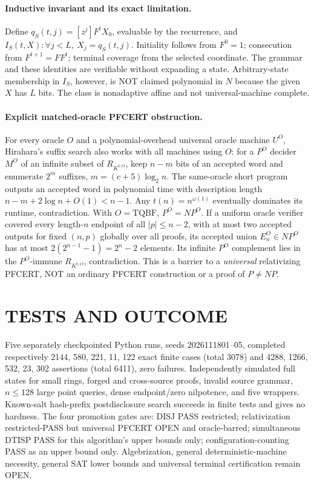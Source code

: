 \documentclass[10pt]{article}
\begin{document}
\paragraph{Inductive invariant and its exact limitation.}
Define $q_S(t,j)=[z^j]F^tX_0$, evaluable by the recurrence,
and $I_S(t,X):\forall j<L,\ X_j=q_S(t,j)$.
Initiality follows from $F^0=1$; consecution from
$F^{t+1}=FF^t$; terminal coverage from the selected coordinate.
The grammar and these identities are verifiable without expanding
a state. Arbitrary-state membership in $I_S$, however, is
NOT claimed polynomial in $N$ because the given $X$ has $L$ bits.
The class is nonadaptive affine and not universal-machine complete.

\paragraph{Explicit matched-oracle PFCERT obstruction.}
For every oracle $O$ and a polynomial-overhead universal oracle
machine $U^O$, Hirahara's suffix search also works with all
machines using $O$: for a $P^O$ decider $M^O$ of an infinite subset
of $R_{K^{t,O}}$, keep $n-m$ bits of an accepted word and enumerate
$2^{m}$ suffixes, $m=(c+5)\log_2 n$. The same-oracle short program
outputs an accepted word in polynomial time with description
length $n-m+2\log n+O(1)<n-1$. Any
$t(n)=n^{\omega(1)}$ eventually dominates its runtime, contradiction.
With $O=\mathrm{TQBF}$, $P^O=NP^O$.
If a uniform oracle verifier covered every length-$n$ endpoint of
all $|p|\le n-2$, with at most two accepted outputs for fixed
$(n,p)$ globally over all proofs, its accepted union
$E_n^O\in NP^O$ has at most
$2(2^{n-1}-1)=2^n-2$ elements.
Its infinite $P^O$ complement lies in the $P^O$-immune
$R_{K^{t,O}}$, contradiction.
This is a barrier to a \emph{universal} relativizing PFCERT,
NOT an ordinary PFCERT construction or a proof of $P\ne NP$.

\section{TESTS AND OUTCOME}
Five separately checkpointed Python runs, seeds 2026111801--05,
completed respectively 2144, 580, 221, 11, 122 exact finite cases
(total 3078) and 4288, 1266, 532, 23, 302 assertions
(total 6411), zero failures.
Independently simulated full states for small rings, forged and
cross-source proofs, invalid source grammar, $n\le128$ large
point queries, dense endpoint/zero nilpotence, and five wrappers.
Known-salt hash-prefix postdisclosure search succeeds in finite
tests and gives no hardness.
The four promotion gates are: DISJ PASS restricted; relativization
restricted-PASS but universal PFCERT OPEN and oracle-barred;
simultaneous DTISP PASS for this algorithm's upper bounds only;
configuration-counting PASS as an upper bound only.
Algebrization, general deterministic-machine necessity,
general SAT lower bounds and universal terminal certification remain OPEN.
\end{document}
